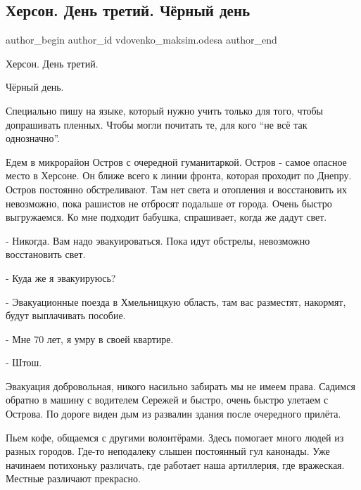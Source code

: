  
 
 
 
 

\subsection{Херсон. День третий. Чёрный день}
\label{sec:29_12_2022.fb.vdovenko_maksim.odesa.1.kherson__den_tretii_}

\ifcmt
 author_begin
   author_id vdovenko_maksim.odesa
 author_end
\fi

Херсон. День третий.

Чёрный день.

Специально пишу на языке, который нужно учить только для того, чтобы
допрашивать пленных. Чтобы могли почитать те, для кого \enquote{не всё так однозначно}.

Едем в микрорайон Остров с очередной гуманитаркой. Остров - самое опасное место
в Херсоне. Он ближе всего к линии фронта, которая проходит по Днепру. Остров
постоянно обстреливают. Там нет света и отопления и восстановить их невозможно,
пока рашистов не отбросят подальше от города. Очень быстро выгружаемся. Ко мне
подходит бабушка, спрашивает, когда же дадут свет.

- Никогда. Вам надо эвакуироваться. Пока идут обстрелы, невозможно восстановить
свет.

- Куда же я эвакуируюсь?

- Эвакуационные поезда в Хмельницкую область, там вас разместят, накормят,
будут выплачивать пособие.

- Мне 70 лет, я умру в своей квартире.

- Штош.

Эвакуация добровольная, никого насильно забирать мы не имеем права. Садимся
обратно в машину с водителем Сережей и быстро, очень быстро улетаем с Острова.
По дороге виден дым из развалин здания после очередного прилёта.

Пьем кофе, общаемся с другими волонтёрами. Здесь помогает много людей из разных
городов. Где-то неподалеку слышен постоянный гул канонады. Уже начинаем
потихоньку различать, где работает наша артиллерия, где вражеская. Местные
различают прекрасно.

